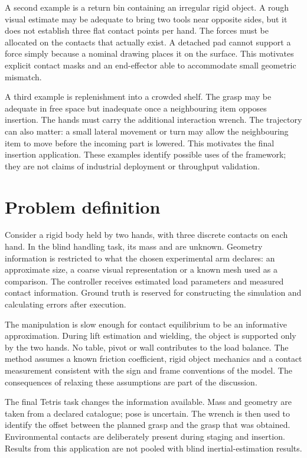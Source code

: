 A second example is a return bin containing an irregular rigid object. A rough visual estimate may be adequate to bring two tools near opposite sides, but it does not establish three flat contact points per hand. The forces must be allocated on the contacts that actually exist. A detached pad cannot support a force simply because a nominal drawing places it on the surface. This motivates explicit contact masks and an end-effector able to accommodate small geometric mismatch.

A third example is replenishment into a crowded shelf. The grasp may be adequate in free space but inadequate once a neighbouring item opposes insertion. The hands must carry the additional interaction wrench. The trajectory can also matter: a small lateral movement or turn may allow the neighbouring item to move before the incoming part is lowered. This motivates the final insertion application. These examples identify possible uses of the framework; they are not claims of industrial deployment or throughput validation.

\section{Problem definition}

Consider a rigid body held by two hands, with three discrete contacts on each hand. In the blind handling task, its mass and \CoM{} are unknown. Geometry information is restricted to what the chosen experimental arm declares: an approximate size, a coarse visual representation or a known mesh used as a comparison. The controller receives estimated load parameters and measured contact information. Ground truth is reserved for constructing the simulation and calculating errors after execution.

The manipulation is slow enough for contact equilibrium to be an informative approximation. During lift estimation and wielding, the object is supported only by the two hands. No table, pivot or wall contributes to the load balance. The method assumes a known friction coefficient, rigid object mechanics and a contact measurement consistent with the sign and frame conventions of the model. The consequences of relaxing these assumptions are part of the discussion.

The final Tetris task changes the information available. Mass and geometry are taken from a declared catalogue; pose is uncertain. The wrench is then used to identify the offset between the planned grasp and the grasp that was obtained. Environmental contacts are deliberately present during staging and insertion. Results from this application are not pooled with blind inertial-estimation results.

